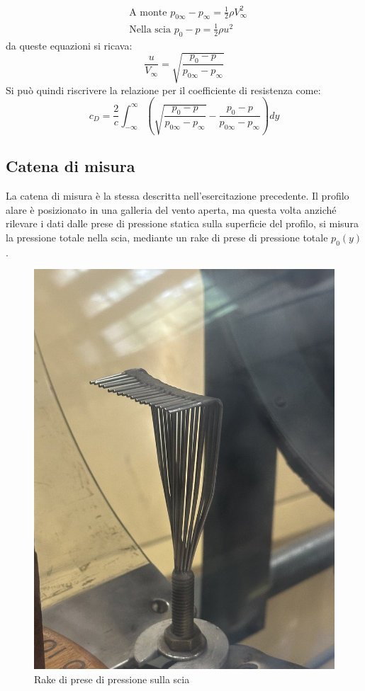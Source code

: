 \begin{equation*}
    \begin{split}
        &\text{A monte } p_{0\infty} - p_\infty = \frac 12 \rho V_\infty^2\\
        &\text{Nella scia } p_{0} - p = \frac 12 \rho u^2
    \end{split}
\end{equation*}
da queste equazioni si ricava:
\begin{equation*}
    \frac{u}{V_\infty} = \sqrt{\frac{p_0 - p}{p_{0\infty} - p_\infty}}
\end{equation*}
Si può quindi riscrivere la relazione per il coefficiente di resistenza come:
\begin{equation*}
    c_D = \frac 2c \int_{-\infty}^{\infty} \left( \sqrt{\frac{p_0 - p}{p_{0\infty} - p_\infty}} - \frac{p_0 - p}{p_{0\infty} - p_\infty} \right) dy
\end{equation*}

\subsection{Catena di misura}
La catena di misura è la stessa descritta nell'esercitazione precedente. Il profilo alare è posizionato in una galleria del vento aperta, ma questa volta anziché rilevare i dati dalle prese di pressione statica sulla superficie del profilo, si misura la pressione totale nella scia, mediante un rake di prese di pressione totale $p_0(y)$.
\begin{figure}[H]
    \centering
    \includegraphics[width=.7\textwidth]{images/6/rake.jpg}
    \caption{Rake di prese di pressione sulla scia}
\end{figure}

